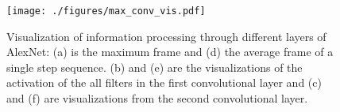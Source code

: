 \begin{figure}
	\centering
		\texttt{[image: ./figures/max\_conv\_vis.pdf]}
	\caption{Visualization of information processing through different layers of AlexNet: (a) is the maximum frame and (d) the average frame of a single step sequence. (b) and (e) are the visualizations of the activation of the all filters in the first convolutional layer and (c) and (f) are visualizations from the second convolutional layer.    }
	\label{fig:max_conv_vis}
\end{figure}





